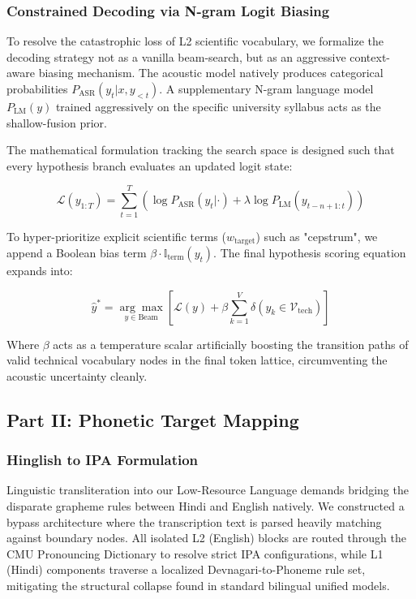 \documentclass[10pt,conference]{IEEEtran}
\begin{document}
\subsubsection{Constrained Decoding via N-gram Logit Biasing}
To resolve the catastrophic loss of L2 scientific vocabulary, we formalize the decoding strategy not as a vanilla beam-search, but as an aggressive context-aware biasing mechanism. The acoustic model natively produces categorical probabilities $P_{\text{ASR}}(y_t|x, y_{<t})$. A supplementary N-gram language model $P_{\text{LM}}(y)$ trained aggressively on the specific university syllabus acts as the shallow-fusion prior.

The mathematical formulation tracking the search space is designed such that every hypothesis branch evaluates an updated logit state:

\begin{equation}
\mathcal{L}(y_{1:T}) = \sum_{t=1}^{T} \left( \log P_{\text{ASR}}(y_t | \cdot) + \lambda \log P_{\text{LM}}(y_{t-n+1:t}) \right)
\end{equation}

To hyper-prioritize explicit scientific terms ($w_{\text{target}}$) such as "cepstrum", we append a Boolean bias term $\beta \cdot \mathbb{I}_{\text{term}}(y_t)$. The final hypothesis scoring equation expands into:

\begin{equation}
\hat{y}^* = \underset{y \in \text{Beam}}{\arg\max} \left[ \mathcal{L}(y) + \beta \sum_{k=1}^{V} \delta(y_k \in \mathcal{V}_{\text{tech}}) \right]
\end{equation}

Where $\beta$ acts as a temperature scalar artificially boosting the transition paths of valid technical vocabulary nodes in the final token lattice, circumventing the acoustic uncertainty cleanly.

\subsection{Part II: Phonetic Target Mapping}

\subsubsection{Hinglish to IPA Formulation}
Linguistic transliteration into our Low-Resource Language demands bridging the disparate grapheme rules between Hindi and English natively. We constructed a bypass architecture where the transcription text is parsed heavily matching against boundary nodes. All isolated L2 (English) blocks are routed through the CMU Pronouncing Dictionary to resolve strict IPA configurations, while L1 (Hindi) components traverse a localized Devnagari-to-Phoneme rule set, mitigating the structural collapse found in standard bilingual unified models.
\end{document}
